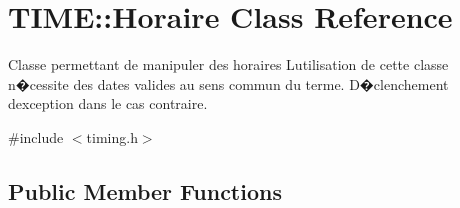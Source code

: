 \hypertarget{class_t_i_m_e_1_1_horaire}{}\section{T\+I\+M\+E\+:\+:Horaire Class Reference}
\label{class_t_i_m_e_1_1_horaire}


Classe permettant de manipuler des horaires L\textquotesingle{}utilisation de cette classe n�cessite des dates valides au sens commun du terme. D�clenchement d\textquotesingle{}exception dans le cas contraire.  




{\ttfamily \#include $<$timing.\+h$>$}

\subsection*{Public Member Functions}
